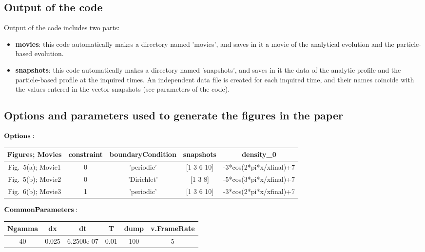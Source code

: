 \documentclass[authoryear,3p,11pt]{elsarticle}
\begin{document}
\subsection{Output of the code} 
Output of the code includes two parts:
\begin{itemize}
\item {\bf movies}: this code automatically makes a directory named 'movies', and saves in it a movie of the analytical evolution and the particle-based evolution.
\item {\bf snapshots}: this code automatically makes a directory named 'snapshots', and saves in it the data of the analytic profile and the particle-based profile at the inquired times. An independent data file is created for each inquired time, and their names coincide with the values entered in the vector snapshots (see parameters of the code).
\end{itemize}

\subsection{Options and parameters used to generate the figures in the paper}

$\bf Options:$
\begin{center}
\begin{tabular}{ |c|c|c|c|c| }
\hline
Figures; Movies & constraint  & boundaryCondition  & snapshots & density\_0 \\
\hline
Fig.~5(a); Movie1 &  0 &  'periodic' & [1 3 6 10] &-3*cos(2*pi*x/xfinal)+7\\
\hline
Fig.~5(b); Movie2 & 0 &'Dirichlet' & [1 3 8] &-5*cos(3*pi*x/xfinal)+7\\
\hline
Fig.~6(b); Movie3 & 1 &'periodic' & [1 3 6 10]&-3*cos(2*pi*x/xfinal)+7\\
\hline
\end{tabular}
\end{center}


$\bf Common Parameters:$
\begin{center}
\begin{tabular}{ |c|c|c|c|c|c| }
\hline
Ngamma & dx & dt & T & dump & v.FrameRate\\
\hline
40 & 0.025 & 6.2500e-07 & 0.01 &100 & 5 \\
\hline
\end{tabular}
\end{center}

\end{document}
